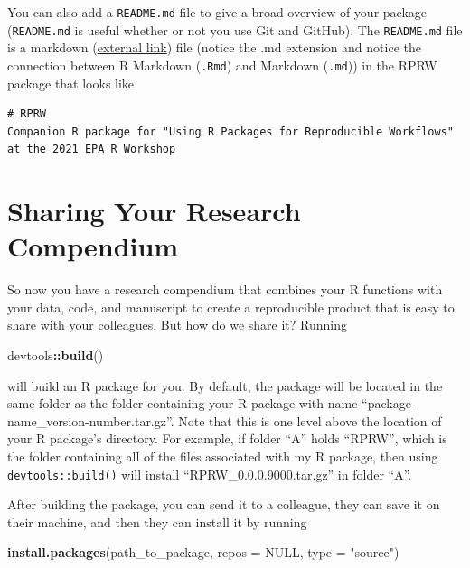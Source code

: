 \documentclass[
]{book}
\newenvironment{Shaded}{\begin{snugshade}}{\end{snugshade}}
\newcommand{\DataTypeTok}[1]{\textcolor[rgb]{0.13,0.29,0.53}{#1}}
\newcommand{\KeywordTok}[1]{\textcolor[rgb]{0.13,0.29,0.53}{\textbf{#1}}}
\newcommand{\NormalTok}[1]{#1}
\newcommand{\OperatorTok}[1]{\textcolor[rgb]{0.81,0.36,0.00}{\textbf{#1}}}
\newcommand{\OtherTok}[1]{\textcolor[rgb]{0.56,0.35,0.01}{#1}}
\newcommand{\StringTok}[1]{\textcolor[rgb]{0.31,0.60,0.02}{#1}}
\begin{document}
You can also add a \texttt{README.md} file to give a broad overview of your package (\texttt{README.md} is useful whether or not you use Git and GitHub). The \texttt{README.md} file is a markdown (\href{https://www.markdownguide.org/}{external link}) file (notice the .md extension and notice the connection between R Markdown (\texttt{.Rmd}) and Markdown (\texttt{.md})) in the RPRW package that looks like

\begin{verbatim}
# RPRW
Companion R package for "Using R Packages for Reproducible Workflows" at the 2021 EPA R Workshop
\end{verbatim}

\hypertarget{sharing-rc}{%
\section{Sharing Your Research Compendium}\label{sharing-rc}}

So now you have a research compendium that combines your R functions with your data, code, and manuscript to create a reproducible product that is easy to share with your colleagues. But how do we share it? Running

\begin{Shaded}
\begin{Highlighting}[]
\NormalTok{devtools}\OperatorTok{::}\KeywordTok{build}\NormalTok{()}
\end{Highlighting}
\end{Shaded}

will build an R package for you. By default, the package will be located in the same folder as the folder containing your R package with name ``package-name\_version-number.tar.gz''. Note that this is one level above the location of your R package's directory. For example, if folder ``A'' holds ``RPRW'', which is the folder containing all of the files associated with my R package, then using \texttt{devtools::build()} will install ``RPRW\_0.0.0.9000.tar.gz'' in folder ``A''.

After building the package, you can send it to a colleague, they can save it on their machine, and then they can install it by running

\begin{Shaded}
\begin{Highlighting}[]
\KeywordTok{install.packages}\NormalTok{(path_to_package, }\DataTypeTok{repos =} \OtherTok{NULL}\NormalTok{, }\DataTypeTok{type =} \StringTok{"source"}\NormalTok{)}
\end{Highlighting}
\end{Shaded}
\end{document}
